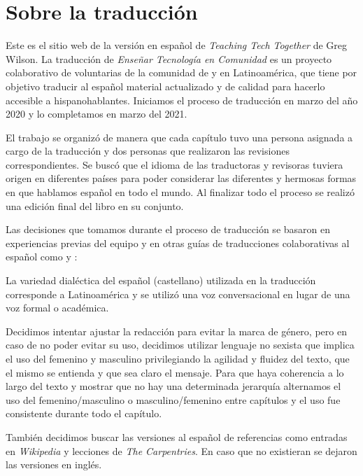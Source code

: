 \chapter*{Sobre la traducción}\label{s:traduccion}

Este es el sitio web de la versión en español de \emph{Teaching Tech Together} de Greg Wilson.
La traducción de \emph{Enseñar Tecnología en Comunidad} es un proyecto colaborativo
de voluntarias de la comunidad de  y 
 en Latinoamérica,
que tiene por objetivo traducir al español material actualizado 
y de calidad para hacerlo accesible a hispanohablantes.
Iniciamos el proceso de traducción en marzo del año 2020 y lo completamos en marzo del 2021.

El trabajo se organizó de manera que cada capítulo tuvo una persona asignada a cargo de la traducción 
y dos personas que realizaron las revisiones correspondientes.  
Se buscó que el idioma de las traductoras y revisoras tuviera origen en diferentes países para
poder considerar las diferentes y hermosas formas en que hablamos español en todo el mundo.
Al finalizar todo el proceso se realizó una edición final del libro en su conjunto.

Las decisiones que tomamos durante el proceso de traducción se basaron en experiencias previas
del equipo y en otras guías de traducciones colaborativas al español como 
y :

La variedad dialéctica del español (castellano) utilizada en la traducción corresponde 
a Latinoamérica y se utilizó una voz conversacional en lugar de una voz formal o académica.

Decidimos intentar ajustar la redacción para evitar la marca de género, pero
en caso de no poder evitar su uso, decidimos utilizar lenguaje no sexista  
que implica el uso del femenino y masculino privilegiando la agilidad y fluidez del texto, 
que el mismo se entienda y que sea claro el mensaje. Para que haya coherencia 
a lo largo del texto y mostrar que no hay una determinada jerarquía 
alternamos el uso del femenino/masculino o masculino/femenino entre capítulos 
y el uso fue consistente durante todo el capítulo. 

También decidimos buscar las versiones al español de referencias como 
entradas en \emph{Wikipedia} y lecciones de \emph{The Carpentries}.  En caso que no existieran 
se dejaron las versiones en inglés.

